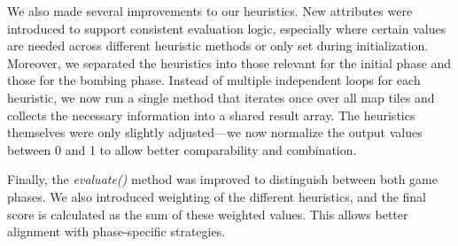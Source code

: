 \noindent We also made several improvements to our heuristics. New attributes were introduced to support consistent evaluation logic, especially where certain values are needed across different heuristic methods or only set during initialization. Moreover, we separated the heuristics into those relevant for the initial phase and those for the bombing phase. Instead of multiple independent loops for each heuristic, we now run a single method that iterates once over all map tiles and collects the necessary information into a shared result array. The heuristics themselves were only slightly adjusted—we now normalize the output values between 0 and 1 to allow better comparability and combination.

\noindent Finally, the \textit{evaluate()} method was improved to distinguish between both game phases. We also introduced weighting of the different heuristics, and the final score is calculated as the sum of these weighted values. This allows better alignment with phase-specific strategies.